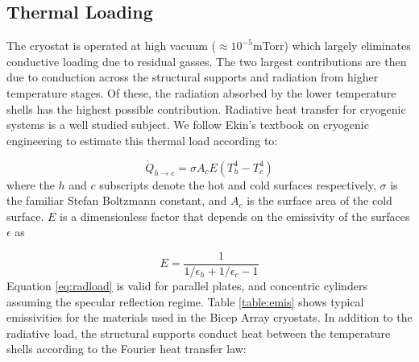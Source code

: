 \documentclass[12pt]{article}
\begin{document}
\subsection{Thermal Loading}
The cryostat is operated at high vacuum ($\approx 10^{-5}$mTorr) which largely
eliminates conductive loading due to residual gasses. The two largest
contributions are then due to conduction across the structural supports and
radiation from higher temperature stages. Of these, the radiation absorbed by
the lower temperature shells has the highest possible contribution. Radiative
heat transfer for cryogenic systems is a well studied subject. We follow
Ekin's textbook \cite{cite:Ekin} on cryogenic engineering to estimate this thermal load
according to:

\begin{equation}
	\dot{Q}_{h\rightarrow c}=\sigma A_{c} E (T_{h}^4 - T_{c}^4)
	\label{eq:radload}
\end{equation}
where the $h$ and $c$ subscripts denote the hot and cold surfaces
respectively, $\sigma$ is the familiar Stefan Boltzmann constant, and $A_c$ is
the surface area of the cold surface. $E$ is a dimensionless factor that
depends on the emissivity of the surfaces $\epsilon$ as

\begin{equation}
	E=\frac{1}{1/\epsilon _h + 1/\epsilon _c - 1}
\end{equation}
Equation \ref{eq:radload} is valid for parallel plates, and concentric
cylinders assuming the specular reflection regime. Table \ref{table:emis} shows
typical emissivities for the materials used in the Bicep Array cryostats. In
addition to the radiative load, the structural supports conduct heat between
the temperature shells according to the Fourier heat transfer law:
\end{document}
